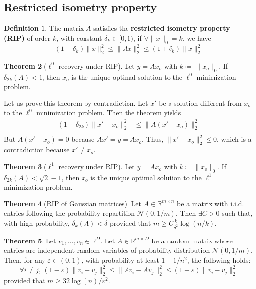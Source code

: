 \documentclass[12pt, openany]{report}
\newcommand{\R}{\mathbb{R}}
\theoremstyle{definition}
\newtheorem{thm}{Theorem}[chapter]
\newtheorem{definition}[thm]{Definition}
\begin{document}
\subsection{Restricted isometry property}
\begin{definition}
	The matrix $A$ satisfies the \textbf{restricted isometry property (RIP)} of order $k$, with constant $\delta_k \in [0,1)$, if $\forall \|x\|_0 = k$, we have
	\begin{equation}
		(1-\delta_k)\|x\|_2^2 \leq \|Ax\|_2^2 \leq (1+\delta_k)\|x\|_2^2
	\end{equation}
\end{definition}
\begin{thm}[$\ell^0$ recovery under RIP]\label{thm:ell0_rip}
	Let $y = Ax_o$ with $k \coloneqq \ \|x_o\|_0$. If $\delta_{2k}(A) < 1$, then $x_o$ is the unique optimal solution to the $\ell^0$ minimization problem.
\end{thm}
Let us prove this theorem by contradiction. Let $x'$ be a solution different from $x_o$ to the $\ell^0$ minimization problem. Then the theorem yields 
\begin{equation}
	\begin{aligned}
		(1-\delta_{2k}) \|x'-x_o\|_2^2 &\leq \|A(x'-x_o)\|_2^2\\
	\end{aligned}
\end{equation}
But $A(x'-x_o) = 0$ because $Ax' = y = Ax_o$. Thus, $\|x'-x_o\|_2^2 \leq 0$, which is a contradiction because $x'\neq x_o$.\\
\begin{thm}[$\ell^1$ recovery under RIP]\label{thm:ell1_rip}
	Let $y = Ax_o$ with $k \coloneqq \|x_o\|_0$. If $\delta_{2k}(A) < \sqrt{2}-1$, then $x_o$ is the unique optimal solution to the $\ell^1$ minimization problem.
\end{thm}
\begin{thm}[RIP of Gaussian matrices]
	Let $A \in \R^{m \times n}$ be a matrix with i.i.d. entries following the probability repartition $\mathcal{N}(0,1/m)$. Then $\exists C > 0$ such that, with high probability, $\delta_k(A) < \delta$ provided that $m \geq C \frac{k}{\delta^2} \log(n/k)$.
\end{thm}
\begin{thm}
	Let $v_1,\dots,v_n\in \R^D$. Let $A\in \R^{m\times D}$ be a random matrix whose entries are independent random variables of probability distribution $\mathcal{N}(0,1/m)$. Then, for any $\varepsilon\in (0,1)$, with probability at least $1-1/n^2$, the following holds:
	\begin{equation}
		\forall i\neq j, \ (1-\varepsilon)\|v_i-v_j\|_2^2\le \|Av_i-Av_j\|_2^2 \le (1+\varepsilon)\|v_i-v_j\|_2^2
	\end{equation}
	provided that $m\ge 32\log(n)/\varepsilon^2$. 
\end{thm}
\end{document}
